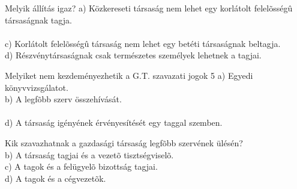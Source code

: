 \begin{frame}

\begin{tcolorbox}[title={70. Kérdés}]
Melyik állítás igaz?
\tcblower
a) Közkereseti társaság nem lehet egy korlátolt felelõsségû társaságnak tagja.\\
\\
c) Korlátolt felelõsségû társaság nem lehet egy betéti társaságnak beltagja.\\
d) Részvénytársaságnak csak természetes személyek lehetnek a tagjai.
\end{tcolorbox}

\begin{tcolorbox}[title={71. Kérdés}]
Melyiket nem kezdeményezhetik a G.T. szavazati jogok 5%
\tcblower
a) Egyedi könyvvizsgálatot.\\
b) A legfõbb szerv összehívását.\\
\\
d) A társaság igényének érvényesítését egy taggal szemben.
\end{tcolorbox}

\begin{tcolorbox}[title={72. Kérdés}]
Kik szavazhatnak a gazdasági társaság legfõbb szervének ülésén?
\tcblower
{}\\
b) A társaság tagjai és a vezetõ tisztségviselõ.\\
c) A tagok és a felügyelõ bizottság tagjai.\\
d) A tagok és a cégvezetõk.
\end{tcolorbox}

\end{frame}


